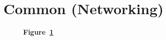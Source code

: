 \section{Common (Networking)}\label{sec:common}

\begin{landscape}
	\begin{figure}[!h]
		\caption*{\textbf{Figure~\ref{fig:common}}}
		\captionlistentry{}\label{fig:common}
	\end{figure}
\end{landscape}
